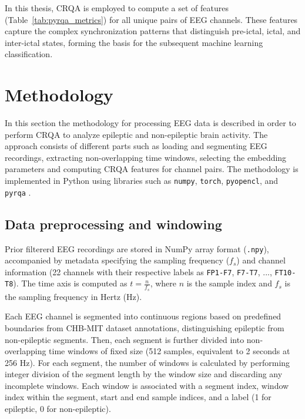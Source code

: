 \documentclass{article}
\begin{document}
					In this thesis, CRQA is employed to compute a set of features (Table~\ref{tab:pyrqa_metrics}) for all unique pairs of EEG channels. These features capture the complex synchronization patterns that distinguish pre-ictal, ictal, and inter-ictal states, forming the basis for the subsequent machine learning classification.





	\newpage

					
				\section{Methodology}
				\label{sec:methodology}

				In this section the methodology for processing EEG data is described in order to perform CRQA to analyze epileptic and non-epileptic brain activity. 
				The approach consists of different parts such as loading and segmenting EEG recordings, 
				extracting non-overlapping time windows, selecting the embedding parameters and computing CRQA features for channel pairs. 
				The methodology is implemented in Python using libraries such as \texttt{numpy}, \texttt{torch}, \texttt{pyopencl}, and \texttt{pyrqa} \cite{pyrqacitation}.

				\subsection{Data preprocessing and windowing}
				\label{subsec:data_preprocessing}

				Prior filtererd EEG recordings are stored in NumPy array format (\texttt{.npy}), 
				accompanied by metadata specifying the sampling frequency (\(f_s\)) and channel information (22 channels with their respective labels as \texttt{FP1-F7}, \texttt{F7-T7}, ..., \texttt{FT10-T8}). 
				The time axis is computed as \(t = \frac{n}{f_s}\), where \(n\) is the sample index and \(f_s\) is the sampling frequency in Hertz (Hz).

				Each EEG channel is segmented into continuous regions based on predefined boundaries from CHB-MIT dataset \cite{chbmitDataset} annotations, distinguishing epileptic from non-epileptic segments. 
				Then, each segment is further divided into non-overlapping time windows of fixed size (512 samples, equivalent to 2 seconds at 256 Hz). 
				For each segment, the number of windows is calculated by performing integer division of the segment length by the window size and discarding any incomplete windows. 
				Each window is associated with a segment index, window index within the segment, start and end sample indices, and a label (1 for epileptic, 0 for non-epileptic).
\end{document}
